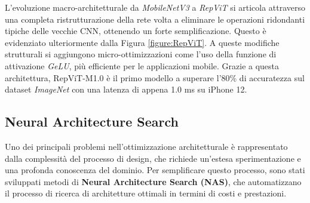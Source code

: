 L'evoluzione macro-architetturale da \textit{MobileNetV3} a \textit{RepViT} si articola attraverso una completa ristrutturazione della rete volta a eliminare le operazioni ridondanti tipiche delle vecchie CNN, ottenendo un forte semplificazione. Questo è evidenziato ulteriormente dalla Figura \ref{figure:RepViT}. A queste modifiche strutturali si aggiungono micro-ottimizzazioni come l'uso della funzione di attivazione \textit{GeLU}, più efficiente per le applicazioni mobile.
Grazie a questa architettura, RepViT-M1.0 è il primo modello a superare l'80\% di accuratezza sul dataset \textit{ImageNet} con una latenza di appena 1.0 ms su iPhone 12.
\subsection{Neural Architecture Search}
Uno dei principali problemi nell'ottimizzazione architetturale è rappresentato
dalla complessità del processo di design, che richiede un'estesa
sperimentazione e una profonda conoscenza del dominio. Per semplificare questo
processo, sono stati sviluppati metodi di \textbf{Neural Architecture Search
    (NAS)}, che automatizzano il processo di ricerca di architetture ottimali in
termini di costi e prestazioni.

